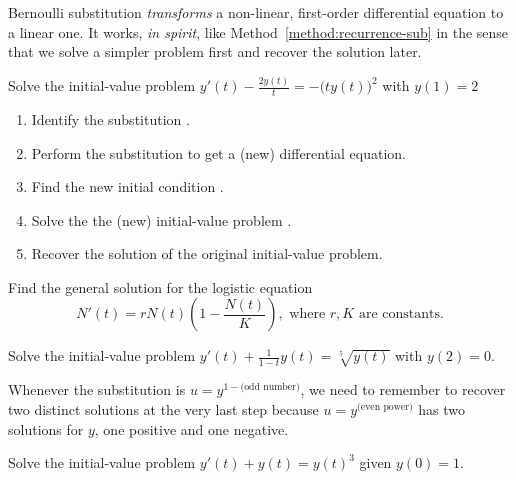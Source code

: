 \documentclass[../main.tex]{subfiles}
\begin{document}
Bernoulli substitution \emph{transforms} a non-linear, first-order differential equation to a linear one. It works, \emph{in spirit}, like Method~\ref{method:recurrence-sub} in the sense that we solve a simpler problem first and recover the solution later.
\begin{example} 
  Solve the initial-value problem \(y'(t) - \frac{2 y(t)}{t}  = -\big( ty(t) \big)^{2}\) with \(y(1) = 2\)

  \begin{enumerate}[wide, label=Step~(\arabic*).]
    \item Identify the substitution \underline{\hspace{2in}}.
    \item Perform the substitution to get a (new) differential equation.
    \item Find the new initial condition \underline{\hspace{3in}}.
    \item Solve the the (new) initial-value problem \underline{\hspace{3in}}.
    \item Recover the solution of the original initial-value problem.
  \end{enumerate}
\end{example}
\clearpage

\begin{example}
  Find the general solution for the logistic equation
  \[
    N'(t) = rN(t) \left( 1 - \frac{N(t)}{K} \right), \text{ where \(r,K\) are constants}.
  \]
\end{example}


\begin{example}
  Solve the initial-value problem \(y'(t) + \frac{1}{1 - t} y(t)  = \sqrt[5]{y(t)}\) with \(y(2) = 0\).
\end{example}
\clearpage

Whenever the substitution is \(u = y^{1-\text{(odd number)}}\), we need to remember to recover two distinct solutions at the very last step because \(u = y^{\text{(even power)}}\) has two solutions for \(y\), one positive and one negative.
\begin{example}
  Solve the initial-value problem \(y'(t) + y(t) = y(t)^{3}\) given \(y(0) = 1\).
\end{example}
\end{document}
